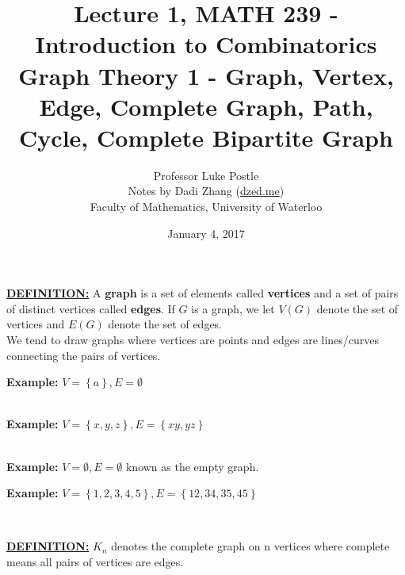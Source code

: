 \documentclass[12pt]{article}
\title{Lecture 1, MATH 239 - Introduction to Combinatorics\\ Graph Theory 1 - Graph, Vertex, Edge, Complete Graph, Path, Cycle, Complete Bipartite Graph}
\date{January 4, 2017}
\author{Professor Luke Postle\\ Notes by Dadi Zhang (\href{http://www.dzed.me}{dzed.me}) \\ Faculty of Mathematics, University of Waterloo}
\newcommand{\definition}[1]{\textbf{\underline{DEFINITION:}}{ #1}}
\begin{document}
\maketitle

\definition{A \textbf{graph} is a set of elements called \textbf{vertices} and a set of pairs of distinct vertices called \textbf{edges}. If $G$ is a graph, we let $V(G)$ denote the set of vertices and $E(G)$ denote the set of edges.} \\

We tend to draw graphs where vertices are points and edges are lines/curves connecting the pairs of vertices.

\textbf{Example:} $V = \left\{a\right\}, E = \emptyset$ \hspace{10px}
 \\

\textbf{Example:} $V = \left\{x, y, z\right\}, E = \left\{xy, yz\right\}$ \hspace{10px}
 \\

\textbf{Example:} $V = \emptyset, E = \emptyset$ known as the empty graph.

\textbf{Example:} $V = \left\{1, 2, 3, 4, 5\right\}, E = \left\{12, 34, 35, 45\right\}$ \hspace{10px}
 \\
\vspace{10px}

\definition{$K_n$ denotes the complete graph on n vertices where complete means all pairs of vertices are edges.}
\end{document}
